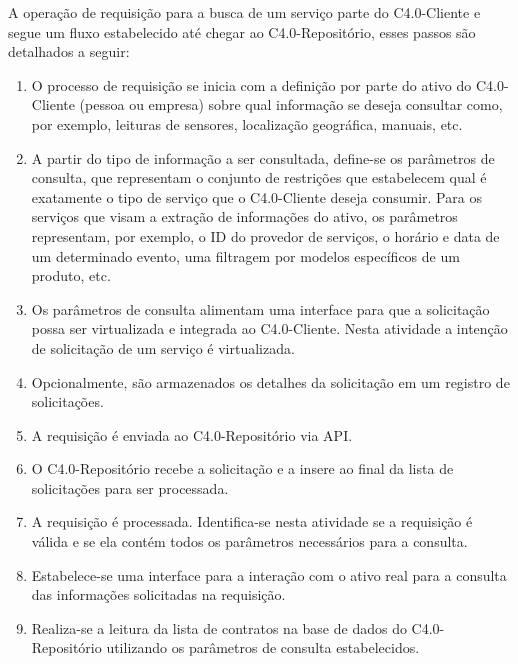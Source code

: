 A operação de requisição para a busca de um serviço parte do C4.0-Cliente e segue um fluxo estabelecido até chegar ao C4.0-Repositório, esses passos são detalhados a seguir:

\begin{enumerate}

	\item O processo de requisição se inicia com a definição por parte do ativo do C4.0-Cliente (pessoa ou empresa) sobre qual informação se deseja consultar como, por exemplo, leituras de sensores, localização geográfica, manuais, etc.

	\item A partir do tipo de informação a ser consultada, define-se os parâmetros de consulta, que representam o conjunto de restrições que estabelecem qual é exatamente o tipo de serviço que o C4.0-Cliente deseja consumir. Para os serviços que visam a extração de informações do ativo, os parâmetros representam, por exemplo, o ID do provedor de serviços, o horário e data de um determinado evento, uma filtragem por modelos específicos de um produto, etc.

	\item Os parâmetros de consulta alimentam uma interface para que a solicitação possa ser virtualizada e integrada ao C4.0-Cliente. Nesta atividade a intenção de solicitação de um serviço é virtualizada.

	\item Opcionalmente, são armazenados os detalhes da solicitação em um registro de solicitações.

	\item A requisição é enviada ao C4.0-Repositório via API.

	\item O C4.0-Repositório recebe a solicitação e a insere ao final da lista de solicitações para ser processada.

	\item A requisição é processada. Identifica-se nesta atividade se a requisição é válida e se ela contém todos os parâmetros necessários para a consulta.

	\item Estabelece-se uma interface para a interação com o ativo real para a consulta das informações solicitadas na requisição.

	\item Realiza-se a leitura da lista de contratos na base de dados do C4.0-Repositório utilizando os parâmetros de consulta estabelecidos.

\end{enumerate}

